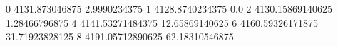 0 4131.873046875 2.9990234375
1 4128.8740234375 0.0
2 4130.15869140625 1.28466796875
4 4141.53271484375 12.65869140625
6 4160.59326171875 31.71923828125
8 4191.05712890625 62.18310546875
